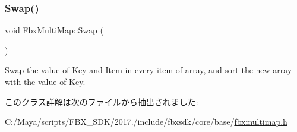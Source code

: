 \subsubsection{\texorpdfstring{Swap()}{Swap()}}
{\footnotesize\ttfamily void Fbx\+Multi\+Map\+::\+Swap (\begin{DoxyParamCaption}{ }\end{DoxyParamCaption})}

Swap the value of Key and Item in every item of array, and sort the new array with the value of Key. 

このクラス詳解は次のファイルから抽出されました\+:\begin{DoxyCompactItemize}
\item 
C\+:/\+Maya/scripts/\+F\+B\+X\+\_\+\+S\+D\+K/2017./include/fbxsdk/core/base/\hyperlink{fbxmultimap_8h}{fbxmultimap.\+h}\end{DoxyCompactItemize}
